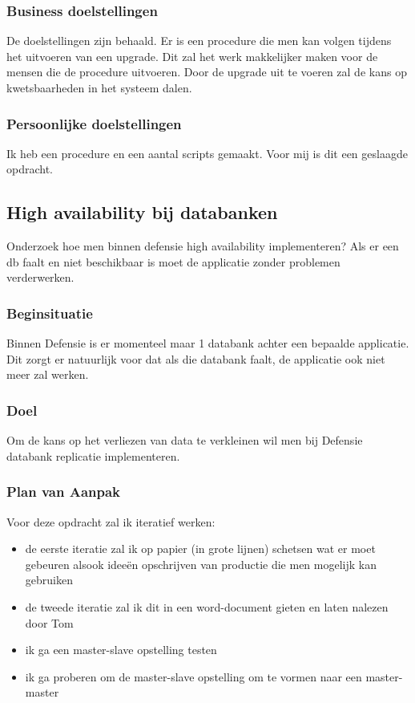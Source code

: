\subsubsection{Business doelstellingen}

De doelstellingen zijn behaald. Er is een procedure die men kan volgen tijdens het uitvoeren van een upgrade. Dit zal het werk makkelijker maken voor de mensen die de procedure uitvoeren. Door de upgrade uit te voeren zal de kans op kwetsbaarheden in het systeem dalen.

\subsubsection{Persoonlijke doelstellingen}

Ik heb een procedure en een aantal scripts gemaakt. Voor mij is dit een geslaagde opdracht.


\subsection{High availability bij databanken}


Onderzoek hoe men binnen defensie high availability implementeren? Als er een db faalt en niet beschikbaar is moet de applicatie zonder problemen verderwerken.

\subsubsection{Beginsituatie}

Binnen Defensie is er momenteel maar 1 databank achter een bepaalde applicatie. Dit zorgt er natuurlijk voor dat als die databank faalt, de applicatie ook niet meer zal werken.

\subsubsection{Doel}

Om de kans op het verliezen van data te verkleinen wil men bij Defensie databank replicatie implementeren.

\subsubsection{Plan van Aanpak}

Voor deze opdracht zal ik iteratief werken:

\begin{itemize}
    \item de eerste iteratie zal ik op papier (in grote lijnen) schetsen wat er moet gebeuren alsook ideeën opschrijven van productie die men mogelijk kan gebruiken
    \item de tweede iteratie zal ik dit in een word-document gieten en laten nalezen door Tom
    \item ik ga een master-slave opstelling testen
    \item ik ga proberen om de master-slave opstelling om te vormen naar een master-master
\end{itemize}

